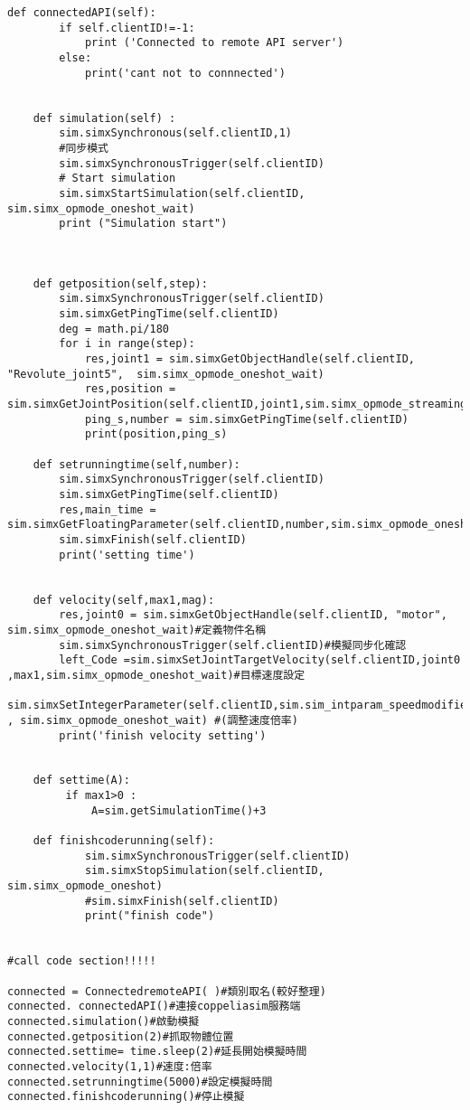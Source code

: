 \documentclass[14pt,a4paper]{report}  %
\begin{document}
{{{{\begin{itemize}
\begin{lstlisting}[caption=遠端API程式架構]
    def connectedAPI(self):
        if self.clientID!=-1:
            print ('Connected to remote API server')
        else:
            print('cant not to connnected')
            
        
    def simulation(self) :
        sim.simxSynchronous(self.clientID,1)
        #同步模式
        sim.simxSynchronousTrigger(self.clientID)
        # Start simulation
        sim.simxStartSimulation(self.clientID, sim.simx_opmode_oneshot_wait)
        print ("Simulation start")

        
    
    def getposition(self,step):
        sim.simxSynchronousTrigger(self.clientID)
        sim.simxGetPingTime(self.clientID)
        deg = math.pi/180
        for i in range(step):
            res,joint1 = sim.simxGetObjectHandle(self.clientID, "Revolute_joint5",  sim.simx_opmode_oneshot_wait)
            res,position = sim.simxGetJointPosition(self.clientID,joint1,sim.simx_opmode_streaming)
            ping_s,number = sim.simxGetPingTime(self.clientID)
            print(position,ping_s)
   
    def setrunningtime(self,number):
        sim.simxSynchronousTrigger(self.clientID)
        sim.simxGetPingTime(self.clientID)
        res,main_time = sim.simxGetFloatingParameter(self.clientID,number,sim.simx_opmode_oneshot_wait)
        sim.simxFinish(self.clientID)
        print('setting time')
        
      
    def velocity(self,max1,mag):
        res,joint0 = sim.simxGetObjectHandle(self.clientID, "motor",  sim.simx_opmode_oneshot_wait)#定義物件名稱
        sim.simxSynchronousTrigger(self.clientID)#模擬同步化確認
        left_Code =sim.simxSetJointTargetVelocity(self.clientID,joint0 ,max1,sim.simx_opmode_oneshot_wait)#目標速度設定
        sim.simxSetIntegerParameter(self.clientID,sim.sim_intparam_speedmodifier,mag , sim.simx_opmode_oneshot_wait) #(調整速度倍率)
        print('finish velocity setting')
                    

    def settime(A):
         if max1>0 :
             A=sim.getSimulationTime()+3 

    def finishcoderunning(self): 
            sim.simxSynchronousTrigger(self.clientID)
            sim.simxStopSimulation(self.clientID, sim.simx_opmode_oneshot)
            #sim.simxFinish(self.clientID)
            print("finish code")
        
        
#call code section!!!!!

connected = ConnectedremoteAPI( )#類別取名(較好整理)
connected. connectedAPI()#連接coppeliasim服務端
connected.simulation()#啟動模擬
connected.getposition(2)#抓取物體位置
connected.settime= time.sleep(2)#延長開始模擬時間
connected.velocity(1,1)#速度:倍率
connected.setrunningtime(5000)#設定模擬時間
connected.finishcoderunning()#停止模擬


\end{lstlisting}
\end{itemize}}}}}
\end{document}
